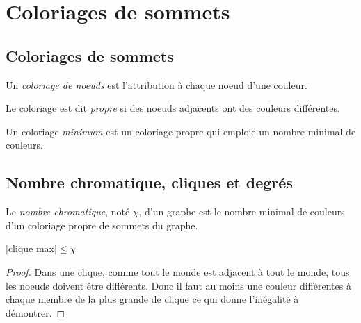 \section{Coloriages de sommets}
\subsection{Coloriages de sommets}
\begin{mydef}
  Un \emph{coloriage de noeuds} est l’attribution à chaque noeud d’une couleur.

  Le coloriage est dit \emph{propre} si des noeuds adjacents ont des couleurs différentes.

  Un coloriage \emph{minimum} est un coloriage propre qui emploie un nombre minimal de couleurs.
\end{mydef}

\subsection{Nombre chromatique, cliques et degrés}
\begin{mydef}
  Le \emph{nombre chromatique}, noté $\chi$, d’un graphe est le nombre minimal de couleurs d’un coloriage propre de sommets du graphe.
\end{mydef}

\begin{mytheo}
  $|$clique max$| \leq \chi$
  \begin{proof}
    Dans une clique, comme tout le monde est adjacent à tout le monde, tous les noeuds doivent être différents.
    Donc il faut au moins une couleur différentes à chaque membre de la plus grande de clique ce qui donne
    l'inégalité à démontrer.
  \end{proof}
\end{mytheo}

